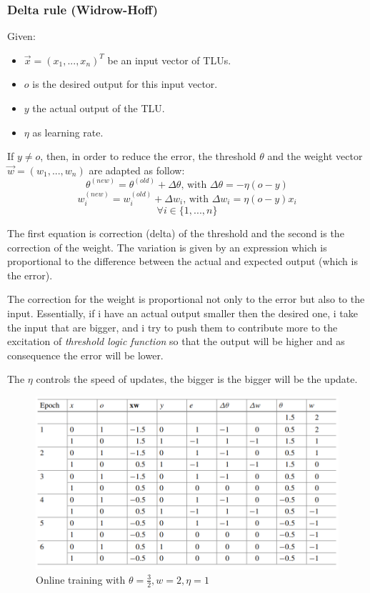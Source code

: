 \documentclass{article}
\begin{document}
\subsubsection{Delta rule (Widrow-Hoff)}
Given:
\begin{itemize}
    \item $\vec{x}=(x_1,...,x_n)^T$ be an input vector of TLUs.
    \item $o$ is the desired output for this input vector.
    \item $y$ the actual output of the TLU.
    \item $\eta$ as learning rate.
\end{itemize}
If $y\neq o$, then, in order to reduce the error, the threshold $\theta$ and the weight
vector $\vec{w}=(w_1,...,w_n)$ are adapted as follow:
$$\theta^{(new)}=\theta^{(old)}+\Delta\theta\text{, with }\Delta\theta=-\eta (o-y)$$
$$w_i^{(new)}=w_i^{(old)}+\Delta w_i\text{, with }\Delta w_i = \eta (o-y)x_i$$
$$\forall i \in \{1,...,n\}$$

The first equation is correction (delta) of the threshold and the second is the correction of the
weight. The variation is given by an expression which is proportional to the difference
between the actual and expected output (which is the error).

The correction for the weight is proportional not only to the error but also to the input.
Essentially, if i have an actual output smaller then the desired one, i take the input
that are bigger, and i try to push them to contribute more to the excitation
of \textit{threshold logic function} so that the output will be higher and as
consequence the error will be lower.

The $\eta$ controls the speed of updates, the bigger is the bigger will be the update.
\begin{figure}[H]
    \centering
    \includegraphics[scale=0.5]{images/online_training.png}
    \caption{Online training with $\theta = \frac{3}{2},w=2,\eta =1$}
\end{figure}
\end{document}
